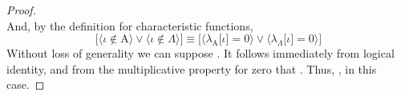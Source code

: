 \documentclass[preview]{standalone}
\begin{document}
\begin{proof}
\begin{equation*}
    \end{equation*}
    And, by the definition for characteristic functions,
    \begin{equation*}
        \bigg[
            \Big \langle \iota \notin \mathrm{A} \Big \rangle
                \lor
            \Big \langle \iota \notin \Lambda \Big \rangle
        \bigg]
            \equiv
        \bigg[
            \Big \langle \lambda_{\mathrm{A}} \big[ \iota \big] = 0 \Big \rangle 
                \lor 
            \Big \langle \lambda_{\Lambda} \big[ \iota \big] = 0 \Big \rangle
        \bigg]
    \end{equation*}
    Without loss of generality we can suppose 
    . 
    It follows immediately from logical identity, 
    and from the multiplicative property for zero that 
    . 
    Thus, 
    , in this case.
\end{proof}
\end{document}

